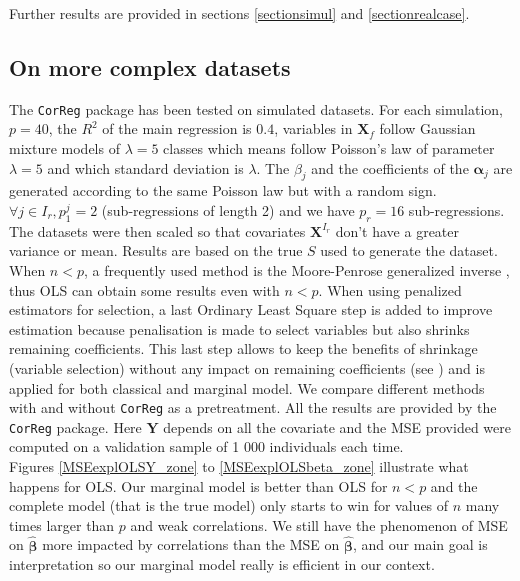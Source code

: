\documentclass[12pt,a4paper]{report}
\begin{document}
 Further results are provided in sections \ref{sectionsimul} and \ref{sectionrealcase}.
 	\FloatBarrier
	\subsection{On more complex datasets}
		The {\tt CorReg} package has been tested on simulated datasets. 
 For each simulation,  $p=40$, the $R^2$ of the main regression is $0.4$, variables in $\boldsymbol{X}_f$ follow Gaussian mixture models of $\lambda=5$ classes which means follow Poisson's law of parameter $\lambda=5$ and which standard deviation is $\lambda$. The $\beta_j$ and the coefficients of the $\boldsymbol{\alpha}_j$ are generated according to the same Poisson law but with a random sign. $\forall j \in I_r, p_1^j=2$ (sub-regressions of length 2) and we have $p_r=16$ sub-regressions. The datasets were then scaled so that covariates $\boldsymbol{X}^{I_r}$ don't have a greater variance or mean.
	Results are based on the true $S$ used to generate the dataset.
	When $n<p$, a frequently used method is the Moore-Penrose generalized inverse \cite{katsikis2008fast}, thus OLS can obtain some results even with $n<p$. %
	When using penalized estimators for selection, a last Ordinary Least Square step is added to improve estimation because penalisation is made to select variables but also shrinks remaining coefficients. This last step allows to keep the benefits of shrinkage (variable selection) without any impact on remaining coefficients (see \cite{SAM10088}) and is applied for both classical and marginal model.
	We compare different methods with and without {\tt CorReg} as a pretreatment. All the results are provided by the {\tt CorReg} package. Here $\boldsymbol{Y}$ depends on all the covariate and the MSE provided were computed on a validation sample of 1 000 individuals each time. \\
	
	Figures \ref{MSEexplOLSY_zone} to \ref{MSEexplOLSbeta_zone} illustrate what happens for OLS. 
Our marginal model is better than OLS for $n<p$ and the complete model (that is the true model) only starts to win for values of $n$ many times larger than $p$ and weak correlations. We still have the phenomenon of MSE on $\hat{\boldsymbol{\beta}}$ more impacted by correlations than the MSE on $\hat{\boldsymbol{\beta}}$, and our main goal is interpretation so our marginal model really is efficient in our context. \\
\end{document}
